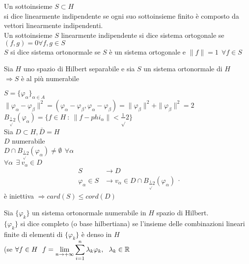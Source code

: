 \documentclass[12px]{article}
\begin{document}
	\begin{defi}
		Un sottoinsieme $S\subset H$\\
		si dice linearmente indipendente se ogni suo sottoinsieme finito è composto da vettori linearmente indipendenti.\\
		Un sottoinsieme  $S$ linearmente indipendente si dice sistema ortogonale se $(f,g) = 0 \forall f,g\in S$\\
		 $S$ si dice sistema ortonormale se $S$ è un sistema ortogonale e $\|f\| = 1 \ \ \forall f\in S$
	\end{defi}
	\begin{prop}
		Sia $H$ uno spazio di Hilbert separabile e sia $S $ un sistema ortonormale di $H$ \\
		$ \Rightarrow  S$ è al più numerabile
	\end{prop}
	\begin{dimo}
		$S = \{ \varphi_\alpha\}_{\alpha\in A}$\\
		 $\| \varphi_\alpha - \varphi_\beta\|^2 = ( \varphi_\alpha - \varphi_\beta, \varphi_\alpha - \varphi_\beta) = \| \varphi_\beta\|^2 + \| \varphi_\beta\|^2 = 2$ \\
		 $B_{\frac 1 \sqrt 2}( \varphi_\alpha) = \{f\in H\ : \ \|f- phi_\alpha \| < \frac 1\sqrt 2\}$\\
		 Sia $D \subset H, \bar D = H$\\
		  $D$ numerabile\\
		  $D\cap B_{\frac 1 \sqrt 2}( \varphi_\alpha) \neq \emptyset \ \ \forall \alpha$\\
		  $\forall \alpha \ \ \exists \ v_\alpha\in D$\\
		   \[
		  \begin{aligned}
			  S & \rightarrow D\\
			  \varphi_\alpha\in S &\rightarrow v_\alpha\in D\cap B_{\frac 1 \sqrt 2}( \varphi_\alpha)
		  \end{aligned}
		  .\] 
		  è iniettiva $ \Rightarrow  card(S)\leq cord(D)$
	\end{dimo}
	\begin{defi}
		Sia $\{ \varphi_k\}$ un sistema ortonormale numerabile in  $H$ spazio di Hilbert.\\
		$ \{\varphi_k\}$ si dice completo (o base hilbertiana) se  l'insieme delle combinazioni lineari finite di elementi di $\{ \varphi_k\}$ è denso in $H$\\
		(se  $\displaystyle\forall f\in H\ \ f = \lim_{n \rightarrow +\infty} \sum^{n}_{i = 1}\lambda_k \varphi_k, \ \ \lambda_k\in \R$
	\end{defi}
\end{document}
